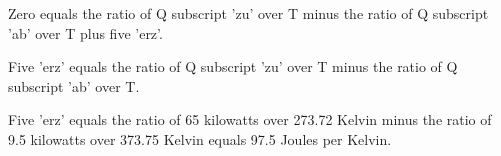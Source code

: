 Zero equals the ratio of Q subscript 'zu' over T minus the ratio of Q subscript 'ab' over T plus five 'erz'.

Five 'erz' equals the ratio of Q subscript 'zu' over T minus the ratio of Q subscript 'ab' over T.

Five 'erz' equals the ratio of 65 kilowatts over 273.72 Kelvin minus the ratio of 9.5 kilowatts over 373.75 Kelvin equals 97.5 Joules per Kelvin.